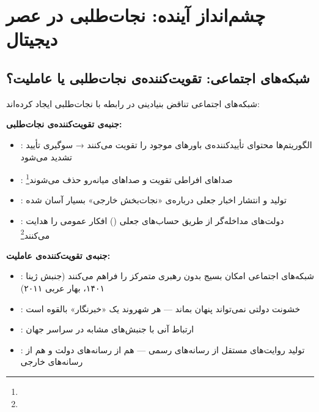 \section{چشم‌انداز آینده: نجات‌طلبی در عصر دیجیتال}
\label{sec:ch14-future}

\subsection{شبکه‌های اجتماعی: تقویت‌کننده‌ی نجات‌طلبی یا عاملیت؟}
\label{subsec:ch14-social-media}

شبکه‌های اجتماعی تناقض بنیادینی در رابطه با نجات‌طلبی ایجاد کرده‌اند:

\begin{tcolorbox}[wavebox, title={شبکه‌های اجتماعی: شمشیر دولبه}]
\textbf{جنبه‌ی تقویت‌کننده‌ی نجات‌طلبی:}
\begin{itemize}
\item {}: الگوریتم‌ها محتوای تأییدکننده‌ی باورهای موجود را تقویت می‌کنند → سوگیری تأیید تشدید می‌شود
\item {}: صداهای افراطی تقویت و صداهای میانه‌رو حذف می‌شوند\footnote{}
\item {}: تولید و انتشار اخبار جعلی درباره‌ی «نجات‌بخش خارجی» بسیار آسان شده
\item {}: دولت‌های مداخله‌گر از طریق حساب‌های جعلی () افکار عمومی را هدایت می‌کنند\footnote{}
\end{itemize}

\textbf{جنبه‌ی تقویت‌کننده‌ی عاملیت:}
\begin{itemize}
\item {}: شبکه‌های اجتماعی امکان بسیج بدون رهبری متمرکز را فراهم می‌کنند (جنبش ژینا ۱۴۰۱، بهار عربی ۲۰۱۱)
\item {}: خشونت دولتی نمی‌تواند پنهان بماند — هر شهروند یک «خبرنگار» بالقوه است
\item {}: ارتباط آنی با جنبش‌های مشابه در سراسر جهان
\item {}: تولید روایت‌های مستقل از رسانه‌های رسمی — هم از رسانه‌های دولت و هم از رسانه‌های خارجی
\end{itemize}
\end{tcolorbox}

